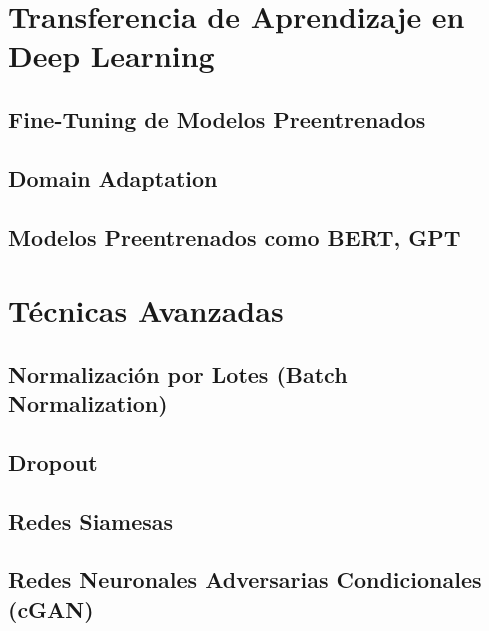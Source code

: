 \documentclass{book}
\begin{document}
\section{Transferencia de Aprendizaje en Deep Learning}

\subsection{Fine-Tuning de Modelos Preentrenados}
\newpage
\subsection{Domain Adaptation}
\newpage
\subsection{Modelos Preentrenados como BERT, GPT}
\newpage
\section{Técnicas Avanzadas}


\subsection{Normalización por Lotes (Batch Normalization)}
\newpage
\subsection{Dropout}
\newpage
\subsection{Redes Siamesas}
\newpage
\subsection{Redes Neuronales Adversarias Condicionales (cGAN)}
\newpage
\end{document}
